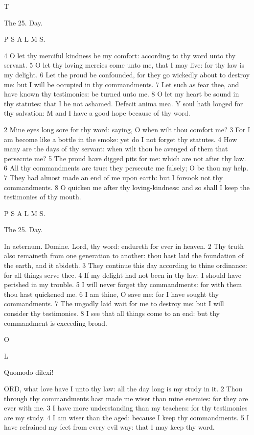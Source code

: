 T

The 25. Day.

P S A L M S.

4 O let thy merciful kindness be my comfort: according to thy word unto thy servant. 5 O let thy loving mercies come unto me, that I may live: for thy law is my delight. 6 Let the proud be confounded, for they go wickedly about to destroy me: but I will be occupied in thy commandments. 7 Let such as fear thee, and have known thy testimonies: be turned unto me. 8 O let my heart be sound in thy statutes: that I be not ashamed. Defecit anima mea. Y soul hath longed for thy salvation: M and I have a good hope because of thy word.

2 Mine eyes long sore for thy word: saying, O when wilt thou comfort me? 3 For I am become like a bottle in the smoke: yet do I not forget thy statutes. 4 How many are the days of thy servant: when wilt thou be avenged of them that persecute me? 5 The proud have digged pits for me: which are not after thy law. 6 All thy commandments are true: they persecute me falsely; O be thou my help. 7 They had almost made an end of me upon earth: but I forsook not thy commandments. 8 O quicken me after thy loving-kindness: and so shall I keep the testimonies of thy mouth.

P S A L M S.

The 25. Day.

In aeternum. Domine. Lord, thy word: endureth for ever in heaven. 2 Thy truth also remaineth from one generation to another: thou hast laid the foundation of the earth, and it abideth. 3 They continue this day according to thine ordinance: for all things serve thee. 4 If my delight had not been in thy law: I should have perished in my trouble. 5 I will never forget thy commandments: for with them thou hast quickened me. 6 I am thine, O save me: for I have sought thy commandments. 7 The ungodly laid wait for me to destroy me: but I will consider thy testimonies. 8 I see that all things come to an end: but thy commandment is exceeding broad.

O

L

Quomodo dilexi!

ORD, what love have I unto thy law: all the day long is my study in it. 2 Thou through thy commandments hast made me wiser than mine enemies: for they are ever with me. 3 I have more understanding than my teachers: for thy testimonies are my study. 4 I am wiser than the aged: because I keep thy commandments. 5 I have refrained my feet from every evil way: that I may keep thy word.

